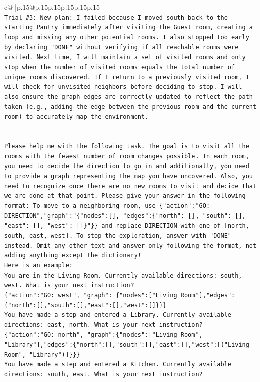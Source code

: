 \documentclass{article}
\begin{document}
{\begin{supertabular}{c@{$\;$}|p{.15\linewidth}@{}p{.15\linewidth}p{.15\linewidth}p{.15\linewidth}p{.15\linewidth}p{.15\linewidth}}
{{{\\ 
\texttt{Trial \#3: New plan: I failed because I moved south back to the starting Pantry immediately after visiting the Guest room, creating a loop and missing any other potential rooms. I also stopped too early by declaring "DONE" without verifying if all reachable rooms were visited. Next time, I will maintain a set of visited rooms and only stop when the number of visited rooms equals the total number of unique rooms discovered. If I return to a previously visited room, I will check for unvisited neighbors before deciding to stop. I will also ensure the graph edges are correctly updated to reflect the path taken (e.g., adding the edge between the previous room and the current room) to accurately map the environment.} \\
\\ 
\\ 
\texttt{Please help me with the following task. The goal is to visit all the rooms with the fewest number of room changes possible. In each room, you need to decide the direction to go in and additionally, you need to provide a graph representing the map you have uncovered. Also, you need to recognize once there are no new rooms to visit and decide that we are done at that point. Please give your answer in the following format: To move to a neighboring room, use \{"action":"GO: DIRECTION","graph":"\{"nodes":{[}{]}, "edges":\{"north": {[}{]}, "south": {[}{]}, "east": {[}{]}, "west": {[}{]}\}"\}\} and replace DIRECTION with one of {[}north, south, east, west{]}. To stop the exploration, answer with "DONE" instead. Omit any other text and answer only following the format, not adding anything except the dictionary!} \\
\texttt{Here is an example: } \\
\texttt{You are in the Living Room. Currently available directions: south, west. What is your next instruction?} \\
\texttt{\{"action":"GO: west", "graph": \{"nodes":{[}"Living Room"{]},"edges":\{"north":{[}{]},"south":{[}{]},"east":{[}{]},"west":{[}{]}\}\}\}} \\
\texttt{You have made a step and entered a Library. Currently available directions: east, north. What is your next instruction?} \\
\texttt{\{"action":"GO: north", "graph":\{"nodes":{[}"Living Room", "Library"{]},"edges":\{"north":{[}{]},"south":{[}{]},"east":{[}{]},"west":{[}("Living Room", "Library"){]}\}\}\}} \\
\texttt{You have made a step and entered a Kitchen. Currently available directions: south, east. What is your next instruction?} \\
}}}
\end{supertabular}}
\end{document}
